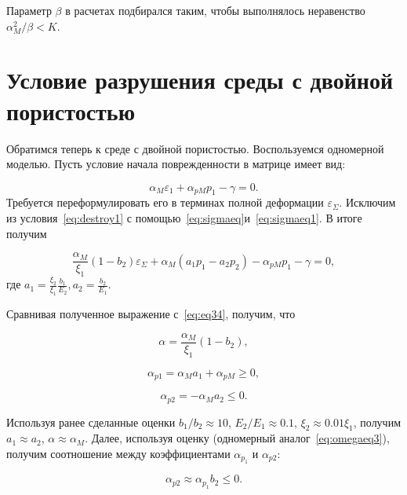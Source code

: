 Параметр $\beta$ в расчетах подбирался таким, чтобы выполнялось неравенство $\alpha_{M}^2 /\beta < K$.

\section{Условие разрушения среды с двойной пористостью}\label{sec:ch2/sec03}

Обратимся теперь к среде с двойной пористостью. Воспользуемся одномерной моделью. Пусть условие начала поврежденности в матрице имеет вид:

\begin{equation}
  \label{eq:destroy1}
  \alpha_M \varepsilon_1 + \alpha_{pM} p_1 - \gamma = 0.
\end{equation}
Требуется переформулировать его в терминах полной деформации $\varepsilon_{\Sigma}$. Исключим  из условия~\eqref{eq:destroy1} с помощью~\eqref{eq:sigmaeq}и~\eqref{eq:sigmaeq1}. В итоге получим

\begin{equation}
  \label{eq:destroy1}
  \frac{\alpha_M }{\xi_1} (1 - b_2) \varepsilon_{\Sigma} + \alpha_M(a_1 p_1 - a_2 p_2) - \alpha_{pM}p_1- \gamma = 0,
\end{equation}
где $a_1=\frac{\xi_2}{\xi_1}\frac{b_1}{E_2}, a_2 = \frac{b_2}{E_1}$.

Сравнивая полученное выражение с~\eqref{eq:eq34}, получим, что

\begin{equation}
  \label{eq:destroy2}
  \alpha = \frac{\alpha_M}{\xi_1} (1 - b_2),
\end{equation}

\begin{equation}
  \label{eq:destroy3}
  \alpha_{p1} = \alpha_{M}a_1+ \alpha_{pM} \geq 0,
\end{equation}

\begin{equation}
  \label{eq:destroy4}
  \alpha_{p2} = - \alpha_{M}a_2 \leq 0.
\end{equation}

Используя ранее сделанные оценки $b_1/b_2 \approx 10$, $E_2/E_1 \approx 0.1$, $\xi_2 \approx 0.01 \xi_1$, получим $a_1 \approx a_2$, $\alpha \approx \alpha_M$. Далее, используя оценку  (одномерный аналог~\eqref{eq:omegaeq3}), получим соотношение между коэффициентами $\alpha_{p_1}$ и $\alpha_{p2}$:

\begin{equation}
  \label{eq:destroy4}
  \alpha_{p2} \approx \alpha_{p_1} b_2 \leq 0.
\end{equation}


